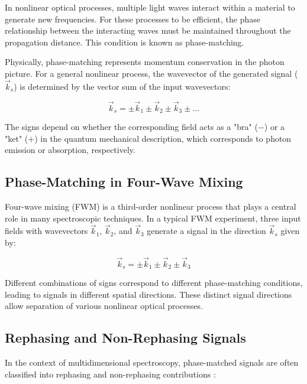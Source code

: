 \noindent In nonlinear optical processes, multiple light waves interact within a material to generate new frequencies. For these processes to be efficient, the phase relationship between the interacting waves must be maintained throughout the propagation distance. This condition is known as phase-matching.

\noindent Physically, phase-matching represents momentum conservation in the photon picture. For a general nonlinear process, the wavevector of the generated signal ($\vec{k}_s$) is determined by the vector sum of the input wavevectors:

\begin{equation}
    \vec{k}_s = \pm\vec{k}_1 \pm\vec{k}_2 \pm\vec{k}_3 \pm \ldots
    \label{eq:phase_matching}
\end{equation}

\noindent The signs depend on whether the corresponding field acts as a "bra" ($-$) or a "ket" ($+$) in the quantum mechanical description, which corresponds to photon emission or absorption, respectively.

\subsection{Phase-Matching in Four-Wave Mixing}
\label{subsec:fwm_phase_matching}

\noindent Four-wave mixing (FWM) is a third-order nonlinear process that plays a central role in many spectroscopic techniques. In a typical FWM experiment, three input fields with wavevectors $\vec{k}_1$, $\vec{k}_2$, and $\vec{k}_3$ generate a signal in the direction $\vec{k}_s$ given by:

\begin{equation}
    \vec{k}_s = \pm\vec{k}_1 \pm\vec{k}_2 \pm\vec{k}_3
    \label{eq:fwm_phase_matching}
\end{equation}

\noindent Different combinations of signs correspond to different phase-matching conditions, leading to signals in different spatial directions. These distinct signal directions allow separation of various nonlinear optical processes.

\subsection{Rephasing and Non-Rephasing Signals}
\label{subsec:rephasing_nonrephasing}

\noindent In the context of multidimensional spectroscopy, phase-matched signals are often classified into rephasing and non-rephasing contributions \cite{Cho2009, Jonas2003}:

